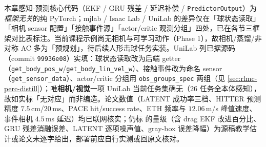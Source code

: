 \begin{finenote}
本章感知-预测核心代码（EKF / GRU 残差 / 延迟补偿 / \verb|PredictorOutput|）为\emph{框架无关}的纯 PyTorch；mjlab / Isaac Lab / UniLab 的差异仅在「球状态读取」「相机 sensor 配置」「接触事件源」「actor/critic 观测分组」四处，已在各节三框架对比表标注。当前课程示例尚无相机与可学习动作（Phase 1），故相机/蒸馏/非对称 AC 多为「预规划」，待后续人形击球任务实装。UniLab 列已据源码（commit \texttt{99936e08}）实填：球状态读取改为后端 getter（\texttt{get\_body\_pos\_w}/\texttt{get\_body\_lin\_vel\_w}）、接触事件改为命名 sensor（\texttt{get\_sensor\_data}）、actor/critic 分组用 \texttt{obs\_groups\_spec} 两组（见 \cref{sec:rlmc-perc-distill}）；唯\textbf{相机/视觉}一项 UniLab 当前任务集确无（$26$ 任务全本体感知），故如实标「无对应」而非编造。论文数值（LATENT 成功率三档、HITTER 预测精度 $7.5$\,cm/$20$\,ms、PACE hit/success rate、ETH 频率与 $12.06$\,m/s 峰值速度、事件相机 $4.5$\,ms 延迟）均已联网核实；仍标 \pz{} 的量级（含 drag EKF 改进百分比、GRU 残差消融误差、LATENT 逐项噪声值、gray-box 误差降幅）为源稿教学估计或论文未逐字给出，部署前应自行实测或回原文核对。
\end{finenote}
